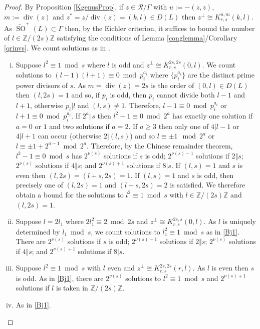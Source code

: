 \documentclass[12pt, a4paper]{article}
\newcommand{\ZZ}{\mathbb{Z}}
\newcommand{\rc}{\mathcal{R}}
\newcommand{\opn}{\operatorname}
\begin{document}
\begin{proof}
  By Proposition \ref{KgenusProp}, if $z \in \rc/\Gamma$ with $u:=-(z,z)$, $m:=\opn{div}(z)$ and $z^*=z/\opn{div}(z) = (k,l) \in D(L)$ then $z^{\perp} \cong K^{u,m}_{r,s}(k,l)$.
 As $\widetilde{\opn{SO}}^+(L) \subset \Gamma$ then,  by the Eichler criterion, it suffices to bound the number of $l \in \ZZ/(2s) \ZZ$ satisfying the conditions of Lemma \ref{conglemma}/Corollary \ref{qrinvs}.
 We count solutions as in \cite[Lemma 3.3]{HMvolapps}.
  \begin{enumerate}[(i)]
  \item \label{Bj1} Suppose $l^2 \equiv 1 \bmod{ s}$ where $l$ is odd and $z^{\perp} \cong K^{2s,2s}_{r,s}(0,l)$.
    We count solutions to $(l-1)(l+1) \equiv 0 \bmod{ p_i^{a_i}}$ where $\{p_i^{a_i} \}$ are the distinct prime power divisors of $s$.
    As $m=\opn{div}(z) =2s$ is the order of $(0,l) \in D(L)$ then $(l,2s)=1$ and so, if $p_i$ is odd, then $p_i$ cannot divide both $l-1$ and $l+1$, otherwise $p_i \vert l$ and $(l,s) \neq 1$.
    Therefore, $l-1 \equiv 0 \bmod{ p_i^{a_i}}$ or $l+1 \equiv 0 \bmod{ p_i^{a_i}}$.
    If $2^{a} \Vert s$ then $l^2 - 1 \equiv 0 \bmod{ 2^a}$ has exactly one solution if $a=0$ or $1$ and two solutions if $a=2$.
    If $a \geq 3$ then only one of $4 \vert l-1$ or $4 \vert l+1$ can occur (otherwise  $2 \vert (l,s)$) and so $l \equiv \pm 1 \mod{ 2^a}$ or $l \equiv \pm 1 + 2^{a-1} \bmod{ 2^a}$.
    Therefore, by the Chinese remainder theorem, $l^2 - 1 \equiv 0 \bmod{ s}$ has
    $2^{\nu(s)}$ solutions if $s$ is odd;
    $2^{\nu(s)-1}$ solutions if $2 \Vert s$;
    $2^{\nu(s)}$ solutions if $4 \Vert s$;
    and
    $2^{\nu(s)+1}$ solutions if $8 \vert s$.
    If $(l,s)=1$ and $s$ is even then $(l,2s)=(l+s, 2s)=1$.
    If $(l,s)=1$ and $s$ is odd, then precisely one of $(l,2s)=1$ and $(l+s, 2s)=2$ is satisfied.
    We therefore obtain a bound for the solutions to $l^2 \equiv 1 \bmod{ s}$ with $l \in \ZZ/(2s)\ZZ$ and $(l, 2s)=1$.
\item Suppose $l=2l_1$ where $2 l_1^2 \equiv 2 \bmod{ 2s}$ and $z^{\perp} \cong K^{2s,s}_{r,s}(0,l)$.
    As $l$ is uniquely determined by $l_1 \bmod{ s}$, we count solutions to $l_1^2 \equiv 1 \bmod{ s}$ as in \eqref{Bj1}.
    There are
    $2^{\nu(s)}$ solutions if $s$ is odd;
    $2^{\nu(s)-1}$ solutions if $2 \Vert s$;
    $2^{\nu(s)}$ solutions if $4 \Vert s$;
    and
    $2^{\nu(s) + 1}$ solutions if $8 \vert s$.
  \item Suppose $l^2 \equiv 1 \bmod{ s}$ with $l$ even and $z^{\perp} \cong K^{2s,2s}_{r,s}(r, l)$.
    As $l$ is even then $s$ is odd.
    As in \eqref{Bj1}, there are  $2^{\nu(s)}$ solutions to $l^2 \equiv 1 \bmod{ s}$ and  $2^{\nu(s)+1}$ solutions if $l$ is taken in $\ZZ / (2s) \ZZ$.
  \item As in \eqref{Bj1}.
  \end{enumerate}
\end{proof}
\end{document}
